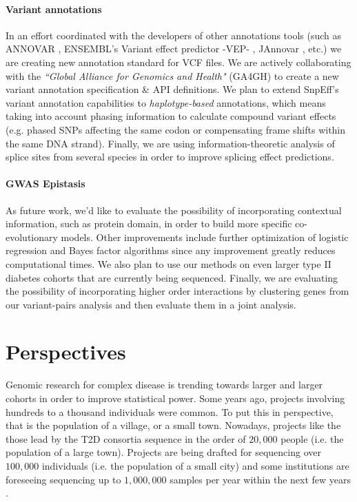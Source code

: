 \paragraph{Variant annotations} In an effort coordinated with the developers of other annotations tools (such as ANNOVAR \cite{wang2010annovar}, ENSEMBL’s Variant effect predictor -VEP- \cite{mclaren2010deriving}, JAnnovar \cite{jager2014jannovar}, etc.) we are creating new annotation standard for VCF files. 
We are actively collaborating with the \textit{``Global Alliance for Genomics and Health"} (GA4GH) to create a new variant annotation specification \& API definitions. 
We plan to extend SnpEff's variant annotation capabilities to \textit{haplotype-based} annotations, which means taking into account phasing information to calculate compound variant effects (e.g. phased SNPs affecting the same codon or compensating frame shifts within the same DNA strand). 
Finally, we are using information-theoretic analysis of splice sites from several species in order to improve splicing effect predictions.

\paragraph{GWAS Epistasis}
As future work, we'd like to evaluate the possibility of incorporating contextual information, such as protein domain, in order to build more specific co-evolutionary models. 
Other improvements include further optimization of logistic regression and Bayes factor algorithms since any improvement greatly reduces computational times. 
We also plan to use our methods on even larger type II diabetes cohorts that are currently being sequenced. 
Finally, we are evaluating the possibility of incorporating higher order interactions by clustering genes from our variant-pairs analysis and then evaluate them in a joint analysis.

\section{Perspectives}

Genomic research for complex disease is trending towards larger and larger cohorts in order to improve statistical power. 
Some years ago, projects involving hundreds to a thousand individuals were common. 
To put this in perspective, that is the population of a village, or a small town. 
Nowadays, projects like the those lead by the T2D consortia sequence in the order of $20,000$ people (i.e. the population of a large town). 
Projects are being drafted for sequencing over $100,000$ individuals \cite{UK100K} (i.e. the population of a small city) and some institutions are foreseeing sequencing up to $1,000,000$ samples per year within the next few years \cite{precisionUS1M}.

